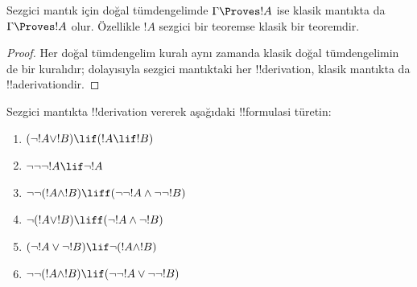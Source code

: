 \begin{prop}
  Sezgici mantık için doğal tümdengelimde $\Gamma \Proves !A$ ise klasik
  mantıkta da $\Gamma \Proves !A$ olur. Özellikle $!A$ sezgici bir teoremse
  klasik bir teoremdir.
\end{prop}

\begin{proof}
  Her doğal tümdengelim kuralı aynı zamanda klasik doğal tümdengelimin de bir
  kuralıdır; dolayısıyla sezgici mantıktaki her !!{derivation}, klasik mantıkta
  da !!a{derivation}{}dir.
\end{proof}

\begin{prob}
  Sezgici mantıkta !!{derivation} vererek aşağıdaki !!{formula}s{}i türetin:
  \begin{enumerate}
    \item $(\lnot !A \lor !B) \lif (!A \lif !B)$
    \item $\lnot\lnot\lnot !A \lif \lnot !A$
    \item $\lnot\lnot (!A \land !B) \liff (\lnot\lnot !A\land \lnot \lnot !B)$
    \item $\lnot (!A \lor !B) \liff (\lnot !A \land \lnot !B)$
    \item $(\lnot !A \lor \lnot !B) \lif \lnot (!A \land !B)$
    \item $\lnot\lnot ( !A \land !B) \lif  (\lnot\lnot !A \lor
    \lnot\lnot !B)$
  \end{enumerate}
\end{prob}

